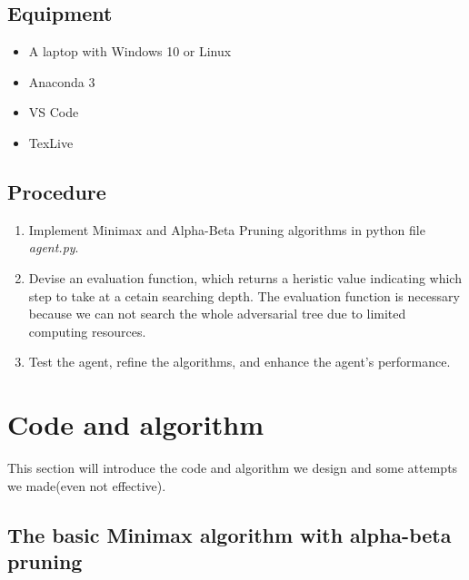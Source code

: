 \documentclass[aps,letterpaper,10pt]{article}
\begin{document}
\subsection{Equipment}
	\begin{itemize}
		\item A laptop with Windows 10 or Linux
		\item Anaconda 3
		\item VS Code 
		\item TexLive
	\end{itemize}

\subsection{Procedure}
\begin{enumerate}
\item Implement Minimax and Alpha-Beta Pruning algorithms in python file {\itshape agent.py}.
\item Devise an evaluation function, which returns a heristic value indicating which step to take at a cetain searching depth. The evaluation function is necessary because we can not search the whole adversarial tree due to limited computing resources. 
\item Test the agent, refine the algorithms, and enhance the agent's performance.
\end{enumerate}

\newpage
\section{Code and algorithm}
This section will introduce the code and algorithm we design and some attempts we made(even not effective).
\vspace{3mm}



\subsection{The basic Minimax algorithm with alpha-beta pruning}
\end{document}
